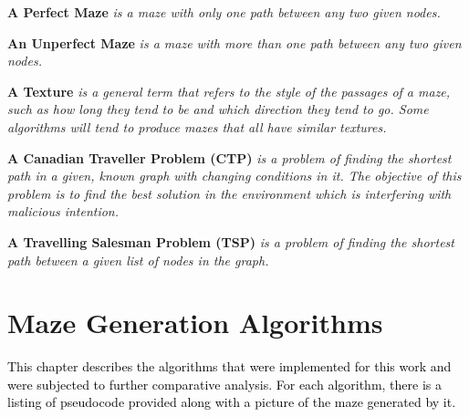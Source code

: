 \begin{definition}\textbf{A Perfect Maze} \emph{is a maze with only one path between any two given nodes.}\end{definition}
\begin{definition}\textbf{An Unperfect Maze} \emph{is a maze with more than one path between any two given nodes.}\end{definition}
 \begin{definition}\textbf{A Texture} \emph{is a general term that refers to the style of the passages of a maze, such as how long they tend to be and which direction they tend to go. Some algorithms will tend to produce mazes that all have similar textures.\cite{15}}\end{definition}
\begin{definition}\textbf{A Canadian Traveller Problem (CTP)} \emph{is a problem of finding the shortest path in a given, known graph with changing conditions in it. The objective of this problem is to find the best solution in the environment which is interfering with malicious intention.}\end{definition}
\begin{definition}\textbf{A Travelling Salesman Problem (TSP)} \emph{is a problem of finding the shortest path between a given list of nodes in the graph.} \end{definition}
\section{Maze Generation Algorithms}
\textcolor{black}{This chapter describes the algorithms that were implemented for this work and were subjected to further comparative analysis. For each algorithm, there is a listing of pseudocode provided along with a picture of the maze generated by it.}
